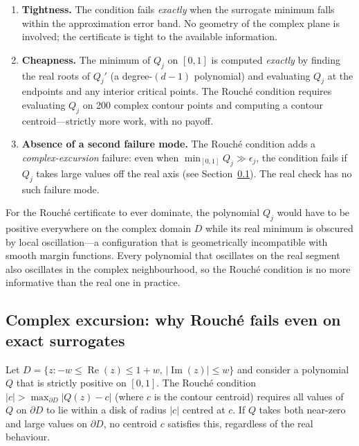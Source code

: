 \documentclass{article}
\theoremstyle{definition}
\newcommand{\abs}[1]{\left|#1\right|}
\begin{document}
\begin{enumerate}
  \item \textbf{Tightness.}  The condition fails \emph{exactly} when the
    surrogate minimum falls within the approximation error band.  No geometry
    of the complex plane is involved; the certificate is tight to the
    available information.

  \item \textbf{Cheapness.}  The minimum of $Q_j$ on $[0,1]$ is computed
    \emph{exactly} by finding the real roots of $Q_j'$ (a degree-$(d{-}1)$
    polynomial) and evaluating $Q_j$ at the endpoints and any interior
    critical points.  The Rouch\'e condition requires evaluating $Q_j$ on
    200 complex contour points and computing a contour centroid---strictly
    more work, with no payoff.

  \item \textbf{Absence of a second failure mode.}  The Rouch\'e condition
    adds a \emph{complex-excursion} failure: even when $\min_{[0,1]} Q_j
    \gg \epsilon_j$, the condition fails if $Q_j$ takes large values off the
    real axis (see Section~\ref{sec:excursion}).  The real check has no such
    failure mode.
\end{enumerate}

For the Rouch\'e certificate to ever dominate, the polynomial $Q_j$ would
have to be positive everywhere on the complex domain $D$ while its real
minimum is obscured by local oscillation---a configuration that is
geometrically incompatible with smooth margin functions.  Every polynomial
that oscillates on the real segment also oscillates in the complex
neighbourhood, so the Rouch\'e condition is no more informative than the
real one in practice.

\subsection{Complex excursion: why Rouch\'e fails even on exact surrogates}
\label{sec:excursion}

Let $D = \{z : -w \leq \operatorname{Re}(z) \leq 1+w,\, \abs{\operatorname{Im}(z)} \leq w\}$
and consider a polynomial $Q$ that is strictly positive on $[0,1]$.
The Rouch\'e condition $\abs{c} > \max_{\partial D}\abs{Q(z)-c}$ (where
$c$ is the contour centroid) requires all values of $Q$ on $\partial D$
to lie within a disk of radius $|c|$ centred at $c$.  If $Q$ takes both
near-zero and large values on $\partial D$, no centroid $c$ satisfies
this, regardless of the real behaviour.
\end{document}
